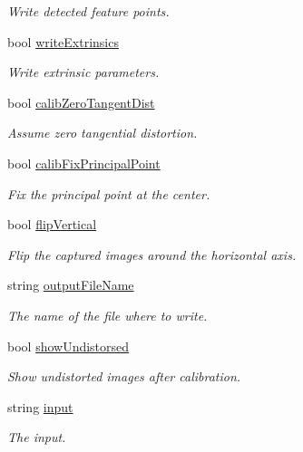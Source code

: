 \begin{DoxyCompactItemize}
\begin{DoxyCompactList}\small\item\em Write detected feature points. \end{DoxyCompactList}\item 
bool \mbox{\hyperlink{class_settings_a1cee56847e08f49c90d2f7e2b0511197}{write\+Extrinsics}}
\begin{DoxyCompactList}\small\item\em Write extrinsic parameters. \end{DoxyCompactList}\item 
bool \mbox{\hyperlink{class_settings_a4bc7ff147d74721a3587ce6fcb64ef32}{calib\+Zero\+Tangent\+Dist}}
\begin{DoxyCompactList}\small\item\em Assume zero tangential distortion. \end{DoxyCompactList}\item 
bool \mbox{\hyperlink{class_settings_a44397eea3f08a0c78808c38bdd716594}{calib\+Fix\+Principal\+Point}}
\begin{DoxyCompactList}\small\item\em Fix the principal point at the center. \end{DoxyCompactList}\item 
bool \mbox{\hyperlink{class_settings_ab6304f260b315d2820f755e1c3a052b5}{flip\+Vertical}}
\begin{DoxyCompactList}\small\item\em Flip the captured images around the horizontal axis. \end{DoxyCompactList}\item 
string \mbox{\hyperlink{class_settings_a9468f1ad53e982f9541d76c8d3228900}{output\+File\+Name}}
\begin{DoxyCompactList}\small\item\em The name of the file where to write. \end{DoxyCompactList}\item 
bool \mbox{\hyperlink{class_settings_a935d6f27ee454e9fee63f8b662f48a06}{show\+Undistorsed}}
\begin{DoxyCompactList}\small\item\em Show undistorted images after calibration. \end{DoxyCompactList}\item 
string \mbox{\hyperlink{class_settings_a9970d51ab47b6560ab11b267637b6219}{input}}
\begin{DoxyCompactList}\small\item\em The input. \end{DoxyCompactList}\item 

\end{DoxyCompactItemize}
